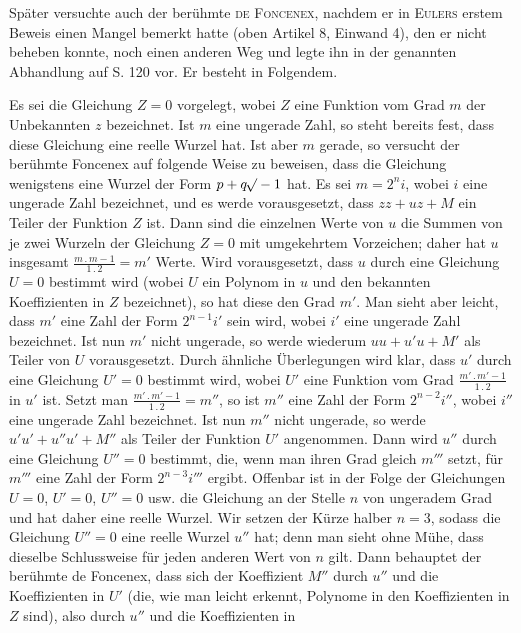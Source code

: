 Später versuchte auch der berühmte \textsc{de Foncenex}, nachdem er in \textsc{Eulers} erstem Beweis einen Mangel bemerkt hatte (oben Artikel 8, Einwand 4), den er nicht beheben konnte, noch einen anderen Weg und legte ihn in der genannten Abhandlung auf S. 120 vor. Er besteht in Folgendem.

Es sei die Gleichung $Z=0$ vorgelegt, wobei $Z$ eine Funktion vom Grad $m$ der Unbekannten $z$ bezeichnet. Ist $m$ eine ungerade Zahl, so steht bereits fest, dass diese Gleichung eine reelle Wurzel hat. Ist aber $m$ gerade, so versucht der berühmte Foncenex auf folgende Weise zu beweisen, dass die Gleichung wenigstens eine Wurzel der Form $p+q\mathord{{}^{}\!\surd}-1$ hat. Es sei $m=2^n i$, wobei $i$ eine ungerade Zahl bezeichnet, und es werde vorausgesetzt, dass $zz+uz+M$ ein Teiler der Funktion $Z$ ist. Dann sind die einzelnen Werte von $u$ die Summen von je zwei Wurzeln der Gleichung $Z=0$ mit umgekehrtem Vorzeichen; daher hat $u$ insgesamt $\frac{m\mathbin{.}m-1}{1\mathbin{.}2}=m'$ Werte. Wird vorausgesetzt, dass $u$ durch eine Gleichung $U=0$ bestimmt wird (wobei $U$ ein Polynom in $u$ und den bekannten Koeffizienten in $Z$ bezeichnet), so hat diese den Grad $m'$. Man sieht aber leicht, dass $m'$ eine Zahl der Form $2^{n-1}i'$ sein wird, wobei $i'$ eine ungerade Zahl bezeichnet. Ist nun $m'$ nicht ungerade, so werde wiederum $uu+u'u+M'$ als Teiler von $U$ vorausgesetzt. Durch ähnliche Überlegungen wird klar, dass $u'$ durch eine Gleichung $U'=0$ bestimmt wird, wobei $U'$ eine Funktion vom Grad $\frac{m'\mathbin{.}m'-1}{1\mathbin{.}2}$ in $u'$ ist. Setzt man $\frac{m'\mathbin{.}m'-1}{1\mathbin{.}2}=m''$, so ist $m''$ eine Zahl der Form $2^{n-2}i''$, wobei $i''$ eine ungerade Zahl bezeichnet. Ist nun $m''$ nicht ungerade, so werde $u'u'+u''u'+M''$ als Teiler der Funktion $U'$ angenommen. Dann wird $u''$ durch eine Gleichung $U''=0$ bestimmt, die, wenn man ihren Grad gleich $m'''$ setzt, für $m'''$ eine Zahl der Form $2^{n-3}i'''$ ergibt. Offenbar ist in der Folge der Gleichungen $U=0$, $U'=0$, $U''=0$ usw. die Gleichung an der Stelle $n$ von ungeradem Grad und hat daher eine reelle Wurzel. Wir setzen der Kürze halber $n=3$, sodass die Gleichung $U''=0$ eine reelle Wurzel $u''$ hat; denn man sieht ohne Mühe, dass dieselbe Schlussweise für jeden anderen Wert von $n$ gilt. Dann behauptet der berühmte de Foncenex, dass sich der Koeffizient $M''$ durch $u''$ und die Koeffizienten in $U'$ (die, wie man leicht erkennt, Polynome in den Koeffizienten in $Z$ sind), also durch $u''$ und die Koeffizienten in
